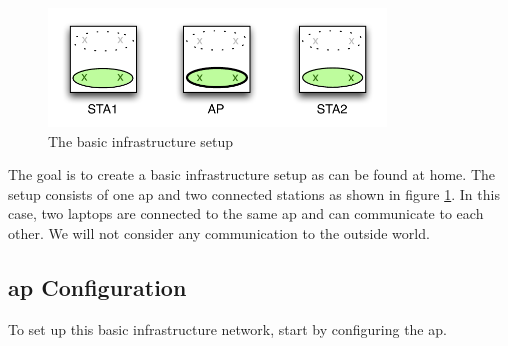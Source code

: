 \begin{figure}[h]
	\begin{center}
		\includegraphics[width=0.8\textwidth]{images/snif1.pdf} 
		\caption{The basic infrastructure setup}
		\label{fig:basic-infra}  
	\end{center}
\end{figure}

The goal is to create a basic infrastructure setup as can be found at home. The setup consists of one \ac{ap} and two connected stations as shown in figure \ref{fig:basic-infra}. In this case, two laptops are connected to the same \ac{ap} and can communicate to each other. We will not consider any communication to the outside world.

\subsection{\ac{ap} Configuration}
To set up this basic infrastructure network, start by configuring the \ac{ap}.

